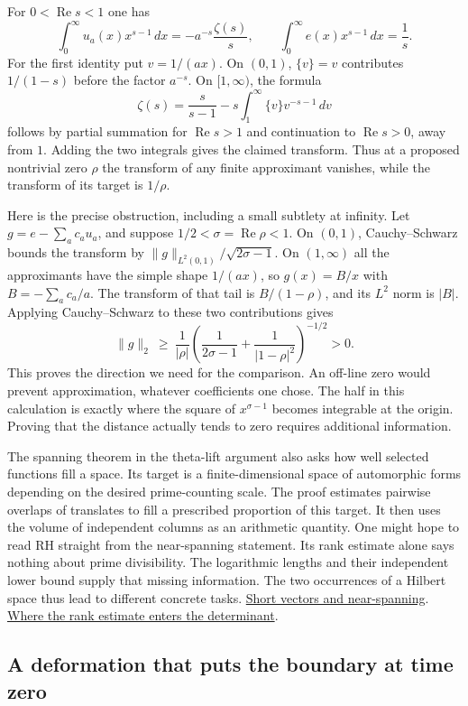 \documentclass[11pt,letterpaper]{article}
\newcommand{\sref}[2]{\href{https://github.com/VladimirReshetnikov/ProveIt/blob/d8415e76ad850651f8c0083afe689dd9f4a45a10/Analysis/GeneralizedRiemannHypothesis/vendor/grh-lean/grh/src/#1.lean}{#2}}
\renewcommand{\Re}{\operatorname{Re}}
\begin{document}
For \(0<\Re s<1\) one has
\[
 \int_0^\infty u_a(x)x^{s-1}\,dx=-a^{-s}\frac{\zeta(s)}s,
 \qquad
 \int_0^\infty e(x)x^{s-1}\,dx=\frac1s .
\]
For the first identity put \(v=1/(ax)\). On \((0,1)\), \(\{v\}=v\) contributes \(1/(1-s)\) before the factor \(a^{-s}\). On \([1,\infty)\), the formula
\[
 \zeta(s)=\frac{s}{s-1}-s\int_1^\infty \{v\}v^{-s-1}\,dv
\]
follows by partial summation for \(\Re s>1\) and continuation to \(\Re s>0\), away from \(1\). Adding the two integrals gives the claimed transform. Thus at a proposed nontrivial zero \(\rho\) the transform of any finite approximant vanishes, while the transform of its target is \(1/\rho\).

Here is the precise obstruction, including a small subtlety at infinity. Let \(g=e-\sum_a c_a u_a\), and suppose \(1/2<\sigma=\Re\rho<1\). On \((0,1)\), Cauchy--Schwarz bounds the transform by \(\|g\|_{L^2(0,1)}/\sqrt{2\sigma-1}\). On \((1,\infty)\) all the approximants have the simple shape \(1/(ax)\), so \(g(x)=B/x\) with \(B=-\sum_a c_a/a\). The transform of that tail is \(B/(1-\rho)\), and its \(L^2\) norm is \(|B|\). Applying Cauchy--Schwarz to these two contributions gives
\[
 \|g\|_{2}\ \ge\
 \frac{1}{|\rho|}
 \left(\frac1{2\sigma-1}+\frac1{|1-\rho|^2}\right)^{-1/2}>0 .
\]
This proves the direction we need for the comparison. An off-line zero would prevent approximation, whatever coefficients one chose. The half in this calculation is exactly where the square of \(x^{\sigma-1}\) becomes integrable at the origin. Proving that the distance actually tends to zero requires additional information.

The spanning theorem in the theta-lift argument also asks how well selected functions fill a space. Its target is a finite-dimensional space of automorphic forms depending on the desired prime-counting scale. The proof estimates pairwise overlaps of translates to fill a prescribed proportion of this target. It then uses the volume of independent columns as an arithmetic quantity. One might hope to read RH straight from the near-spanning statement. Its rank estimate alone says nothing about prime divisibility. The logarithmic lengths and their independent lower bound supply that missing information. The two occurrences of a Hilbert space thus lead to different concrete tasks. \sref{New/Reduction/ShortAndEnough}{Short vectors and near-spanning}. \sref{New/Reduction/MainInequality}{Where the rank estimate enters the determinant}.

\subsection{A deformation that puts the boundary at time zero}
\end{document}
